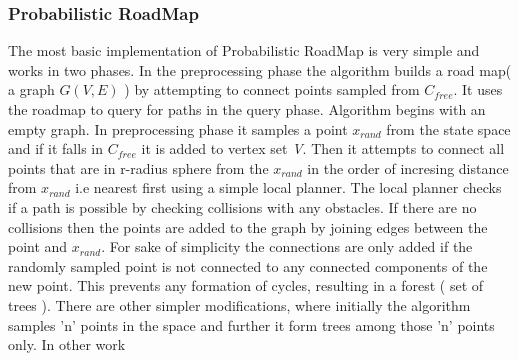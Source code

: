\documentclass[MTech]{iitmdiss}
\begin{document}
\subsubsection{Probabilistic RoadMap}
The most basic implementation of Probabilistic RoadMap is very simple and works in two phases. In the preprocessing phase the algorithm builds a road map( a graph $G(V,E)$ )  by attempting to connect points sampled from $C_{free} $. It uses the roadmap to query for paths in the query phase. Algorithm begins with an empty graph. In preprocessing phase it samples a point $x_{rand}$ from the state space and if it falls in $C_{free}$ it is added to vertex set \emph{V}. Then it attempts to connect all points that are in r-radius sphere from the $x_{rand}$ in the order of incresing distance from $x_{rand}$ i.e nearest first using a simple local planner. The local planner checks if a path is possible by checking collisions with any obstacles. If there are no collisions then the points are added to the graph by joining edges between the point and $x_{rand}$. For sake of simplicity the connections are only added if the randomly sampled point is not connected to any connected components of the new point. This prevents any formation of cycles, resulting in a forest ( set of trees ). There are other simpler modifications, where initially the algorithm samples 'n' points in the space and further it form trees among those 'n' points only. In other work \cite{lav06}
\end{document}
